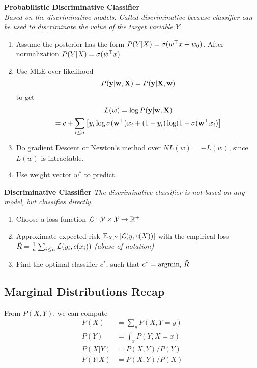 \vspace{1em}
\textbf{Probabilistic Discriminative Classifier} \\
\textit{Based on the discriminative models. Called discriminative because classifier can be used to discriminate the value of the target variable $Y$.}
\begin{enumerate}
	\item Assume the posterior has the form $P(Y|X) = \sigma({w}^\top x + w_0)$. After normalization $P(Y|X) = \sigma({\tilde w}^\top x)$
	\item Use MLE over  likelihood 
	\begin{equation*}
		P(\mathbf y|\mathbf w, \mathbf X) = P(\mathbf y|\mathbf X, \mathbf w)
	\end{equation*}
	to get
	\begin{multline*}
		L(w) = \log P(\mathbf y|\mathbf w, \mathbf X)\\
		 = c + \sum_{i\leq n}\left[y_i\log\sigma({\mathbf w}^\top) x_i+ (1-y_i)\log(1-\sigma({\mathbf w}^\top x_i) \right]
	\end{multline*}
	\item Do gradient Descent or Newton's method over $\mathit{NL}(w) = -L(w)$, since $L(w)$ is intractable.
	\item Use weight vector $w^*$ to predict.
\end{enumerate}

\vspace{1em}
\textbf{Discriminative Classifier}
\textit{The discriminative classifier is not based on any model, but classifies directly.}
\begin{enumerate}
	\item  Choose a loss function $\mathcal L : \mathcal Y \times \mathcal Y \to \mathbb R^+$
	\item Approximate expected risk $\mathbb E_{X,Y}[\mathcal L(y, c(X))]$ with the empirical loss $\hat R = \frac{1}{n}\sum_{i\leq n} \mathcal L(y_i, c(x_i))$ \textit{(abuse of notation)}
	\item Find the optimal classifier $c^*$, such that $c^* = \mathop{\mathrm{argmin}}_c \hat R$
\end{enumerate}


\subsection{Marginal Distributions Recap}
From $P(X,Y)$, we can compute
\begin{align*}
	P(X) &= \sum_y P(X, Y=y) \\
	P(Y) &= \int_x P(Y, X=x) \\
	P(X|Y) &= P(X,Y)/P(Y) \\
	P(Y|X) &= P(X,Y)/P(X)
\end{align*}



